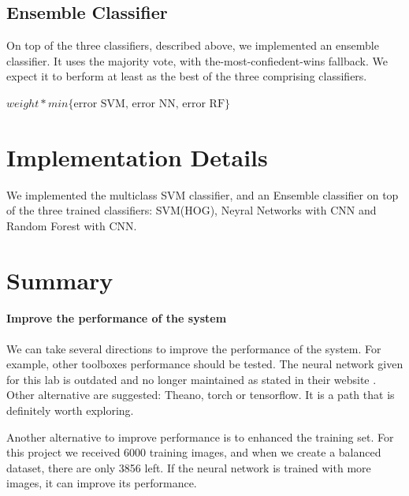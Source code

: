 \documentclass{article} %
\begin{document}
\subsection{Ensemble Classifier}

On top of the three classifiers, described above, we implemented an ensemble classifier. It uses the majority vote, with the-most-confiedent-wins fallback. We expect it to berform at least as the best of the three comprising classifiers.


$weight*min\{\text{error SVM, error NN, error RF}\} $

\section{Implementation Details}

We implemented the multiclass SVM classifier, and an Ensemble classifier on top of the three trained classifiers: SVM(HOG), Neyral Networks with CNN and Random Forest with CNN.







\section{Summary}



\paragraph{Improve the performance of the system}
We can take several directions to improve the performance of the system.
For example, other toolboxes performance should be tested. The neural network given for this lab is outdated and no longer maintained as stated in their website \cite{deeplearningtoolbox}. Other alternative are suggested: Theano, torch or tensorflow. It is a path that is definitely worth exploring.

Another alternative to improve performance is to enhanced the training set. 
For this project we received 6000 training images, and when we create a balanced dataset, there are only 3856 left.
If the neural network is trained with more images, it can improve its performance.










\end{document}
